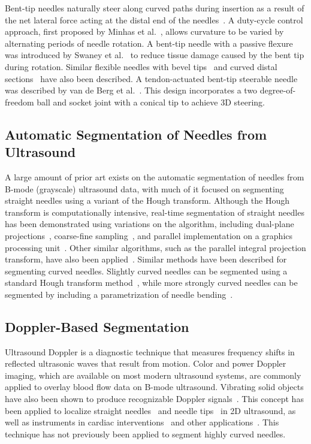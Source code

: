 Bent-tip needles naturally steer along curved paths during insertion as a result of the net lateral force acting at the distal end of the needles~\cite{Webster2006}. A duty-cycle control approach, first proposed by Minhas et al.~\cite{Minhas2007}, allows curvature to be varied by alternating periods of needle rotation. A bent-tip needle with a passive flexure was introduced by Swaney et al.~\cite{Swaney2013} to reduce tissue damage caused by the bent tip during rotation. Similar flexible needles with bevel tips~\cite{OLeary2003,Alterovitz2005} and curved distal sections~\cite{Wedlick2009} have also been described. A tendon-actuated bent-tip steerable needle was described by van de Berg et al.~\cite{vandeBerg2015}. This design incorporates a two degree-of-freedom ball and socket joint with a conical tip to achieve 3D steering.

\subsection{Automatic Segmentation of Needles from Ultrasound}
A large amount of prior art exists on the automatic segmentation of needles from B-mode (grayscale) ultrasound data, with much of it focused on segmenting straight needles using a variant of the Hough transform. Although the Hough transform is computationally intensive, real-time segmentation of straight needles has been demonstrated using variations on the algorithm, including dual-plane projections~\cite{Ding2003b}, coarse-fine sampling~\cite{Ding2003a,Zhou2008}, and parallel implementation on a graphics processing unit~\cite{Novotny2007}. Other similar algorithms, such as the parallel integral projection transform, have also been applied~\cite{Barva2008}. Similar methods have been described for segmenting curved needles. Slightly curved needles can be segmented using a standard Hough transform method~\cite{Okazawa2006,Aboofazeli2009}, while more strongly curved needles can be segmented by including a parametrization of needle bending~\cite{Okazawa2006,Neshat2008,Uhercik2010}.

\subsection{Doppler-Based Segmentation}
\label{sec:Doppler-BasedSegmentation}
Ultrasound Doppler is a diagnostic technique that measures frequency shifts in reflected ultrasonic waves that result from motion. Color and power Doppler imaging, which are available on most modern ultrasound systems, are commonly applied to overlay blood flow data on B-mode ultrasound. Vibrating solid objects have also been shown to produce recognizable Doppler signals~\cite{Holen1985}. This concept has been applied to localize straight needles~\cite{Armstrong2001,Feld1997,Hamper1991} and needle tips~\cite{Harmat2006} in 2D ultrasound, as well as instruments in cardiac interventions~\cite{Fronheiser2008,Reddy2008} and other applications~\cite{McAleavey2003,Rogers2009}. This technique has not previously been applied to segment highly curved needles.

